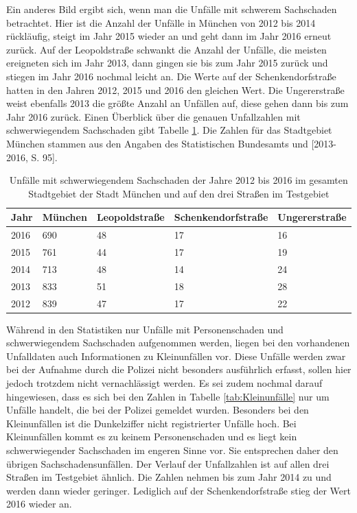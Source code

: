Ein anderes Bild ergibt sich, wenn man die Unfälle mit schwerem Sachschaden betrachtet. Hier ist die Anzahl der Unfälle in München von 2012 bis 2014 rückläufig, steigt im Jahr 2015 wieder an und geht dann im Jahr 2016 erneut zurück. Auf der Leopoldstraße schwankt die Anzahl der Unfälle, die meisten ereigneten sich im Jahr 2013, dann gingen sie bis zum Jahr 2015 zurück und stiegen im Jahr 2016 nochmal leicht an. Die Werte auf der Schenkendorfstraße hatten in den Jahren 2012, 2015 und 2016 den gleichen Wert. Die Ungererstraße weist ebenfalls 2013 die größte Anzahl an Unfällen auf, diese gehen dann bis zum Jahr 2016 zurück. Einen Überblick über die genauen Unfallzahlen mit schwerwiegendem Sachschaden gibt Tabelle \ref{tab:Unfälle München schwerw. Sachschaden}. Die Zahlen für das Stadtgebiet München stammen aus den Angaben des Statistischen Bundesamts \parencite[S. 98]{StatistischesBundesamt.2017} und [2013-2016, S. 95].

\begin{table}[htpb]
	\scriptsize
	\caption[Unfälle mit schwerwiegendem Sachschaden]{Unfälle mit schwerwiegendem Sachschaden der Jahre 2012 bis 2016 im gesamten Stadtgebiet der Stadt München und auf den drei Straßen im Testgebiet}\label{tab:Unfälle München schwerw. Sachschaden}
	\centering
	\begin{tabular}{l l l l p{2cm}}
		\toprule
		Jahr & München & Leopoldstraße & Schenkendorfstraße & Ungererstraße \\
		\midrule
		2016 & 690 & 48 & 17 & 16\\
		2015 & 761 & 44 & 17 & 19\\
		2014 & 713 & 48 & 14 & 24\\
		2013 & 833 & 51 & 18 & 28\\
		2012 & 839 & 47 & 17 & 22\\
		\bottomrule
	\end{tabular}
\end{table}

Während in den Statistiken nur Unfälle mit Personenschaden und schwerwiegendem Sachschaden aufgenommen werden, liegen bei den vorhandenen Unfalldaten auch Informationen zu Kleinunfällen vor. Diese Unfälle werden zwar bei der Aufnahme durch die Polizei nicht besonders ausführlich erfasst, sollen hier jedoch trotzdem nicht vernachlässigt werden. Es sei zudem nochmal darauf hingewiesen, dass es sich bei den Zahlen in Tabelle \ref{tab:Kleinunfälle} nur um Unfälle handelt, die bei der Polizei gemeldet wurden. Besonders bei den Kleinunfällen ist die Dunkelziffer nicht registrierter Unfälle hoch. Bei Kleinunfällen kommt es zu keinem Personenschaden und es liegt kein schwerwiegender Sachschaden im engeren Sinne vor. Sie entsprechen daher den übrigen Sachschadensunfällen. Der Verlauf der Unfallzahlen ist auf allen drei Straßen im Testgebiet ähnlich. Die Zahlen nehmen bis zum Jahr 2014 zu und werden dann wieder geringer. Lediglich auf der Schenkendorfstraße stieg der Wert 2016 wieder an.

